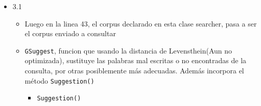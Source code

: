 \begin{enumerate}
  \begin{itemize}
  \item
    3.1

    \begin{itemize}
    \tightlist
    \item
      Luego en la linea 43, el corpus declarado en esta clase searcher,
      pasa a ser el corpus enviado a consultar
    \item
      \texttt{GSuggest}, funcion que usando la distancia de
      Levensthein(Aun no optimizada), sustituye las palabras mal
      escritas o no encontradas de la consulta, por otras posiblemente
      más adecuadas. Además incorpora el método \texttt{Suggestion()}

      \begin{itemize}
      \tightlist
      \item
        \texttt{Suggestion()}
      \end{itemize}

\begin{Shaded}
\begin{Highlighting}[]
   \OperatorTok{(}\OperatorTok{,}\OperatorTok{)\{}
\OperatorTok{=} \OperatorTok{;}

 \OperatorTok{(!}\OperatorTok{(}\OperatorTok{))\{}
     \OperatorTok{(}\OperatorTok{=} \OperatorTok{;}\OperatorTok{\textless{}} \OperatorTok{/}  \OperatorTok{+} \OperatorTok{;}\OperatorTok{++)\{}
         \OperatorTok{(}\OperatorTok{)\{}
             \OperatorTok{(}\OperatorTok{(}\OperatorTok{,}\OperatorTok{)} \OperatorTok{==}\OperatorTok{)\{}\OperatorTok{=} \OperatorTok{(}\OperatorTok{,}\OperatorTok{,}\OperatorTok{,}\OperatorTok{);} \OperatorTok{\}}
        \OperatorTok{\}}
         \OperatorTok{(}\OperatorTok{!=} \OperatorTok{)} \OperatorTok{;}
    \OperatorTok{\}}
\OperatorTok{\}}
\OperatorTok{;}
\OperatorTok{\}}
\end{Highlighting}
\end{Shaded}


\end{itemize}
\end{itemize}
\end{enumerate}
